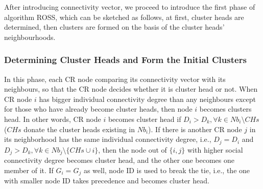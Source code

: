 \documentclass[journal,comsoc]{IEEEtran}
\theoremstyle{mytheoremstyle}
\theoremstyle{mytheoremstyle}
\theoremstyle{mytheoremstyle}
\newcommand{\ie}{i.e., }
\begin{document}
After introducing connectivity vector, we proceed to introduce the first phase of algorithm ROSS, which can be sketched as follows, at first, cluster heads are determined, then clusters are formed on the basis of the cluster heads' neighbourhoods.


\subsubsection{Determining Cluster Heads and Form the Initial Clusters}
In this phase, each CR node comparing its connectivity vector with its neighbours, so that the CR node decides whether it is cluster head or not.
When CR node $i$ has bigger individual connectivity degree than any neighbours except for those who have already become cluster heads, then node $i$ becomes clusters head.
In other words, CR node $i$ becomes cluster head if $D_i > D_k, \forall k\in Nb_i\setminus CHs$ ($CHs$ donate the cluster heads existing in $Nb_i$).
If there is another CR node $j$ in its neighborhood has the same individual connectivity degree, \ie $D_j = D_i$ and $D_j > D_{k}, \forall k\in Nb_j\setminus \{CHs\cup i\}$, then the node out of $\{i, j\}$ with higher social connectivity degree becomes cluster head, and the other one becomes one member of it. 
If $G_i = G_j$ as well, node ID is used to break the tie, \ie the one with smaller node ID takes precedence and becomes cluster head.
\end{document}
